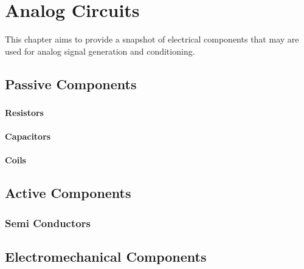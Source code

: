 \chapter{Analog Circuits}
\label{chap:\currfilebase}

This chapter aims to provide a snapshot of electrical components that may are used for analog signal generation and conditioning.

\section{Passive Components}

\subsection{}
\subsubsection{Resistors}

\subsubsection{Capacitors}

\subsubsection{Coils}

\section{Active Components}

\subsection{Semi Conductors}


\section{Electromechanical Components}

\section{}